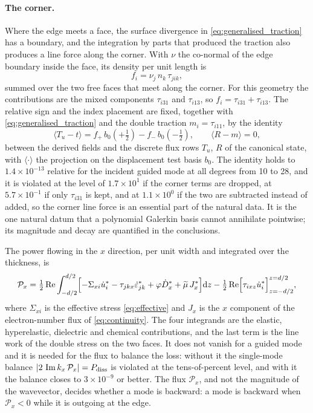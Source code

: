 \paragraph{The corner.}  Where the edge meets a face, the surface divergence in \eqref{eq:generalised_traction} has a boundary, and the integration by parts that produced the traction also produces a line force along the corner.  With $\nu$ the co-normal of the edge boundary inside the face, its density per unit length is
\begin{equation}
\label{eq:corner_force}
f_i=\nu_j\,n_k\,\tau_{jik},
\end{equation}
summed over the two free faces that meet along the corner.  For this geometry the contributions are the mixed components $\tau_{i31}$ and $\tau_{i13}$, so $f_i=\tau_{i31}+\tau_{i13}$.  The relative sign and the index placement are fixed, together with \eqref{eq:generalised_traction} and the double traction $m_i=\tau_{i11}$, by the identity
\begin{equation}
\label{eq:corner_identity}
\bigl\langle T_{\!u}-t\bigr\rangle
=f_+\,b_0(+\tfrac12)-f_-\,b_0(-\tfrac12),
\qquad
\bigl\langle R-m\bigr\rangle=0 ,
\end{equation}
between the derived fields and the discrete flux rows $T_{\!u}$, $R$ of the canonical state, with $\langle\cdot\rangle$ the projection on the displacement test basis $b_0$.  The identity holds to $1.4\times10^{-13}$ relative for the incident guided mode at all degrees from 10 to 28, and it is violated at the level of $1.7\times10^{1}$ if the corner terms are dropped, at $5.7\times10^{-1}$ if only $\tau_{i31}$ is kept, and at $1.1\times10^{0}$ if the two are subtracted instead of added, so the corner line force is an essential part of the natural data.  It is the one natural datum that a polynomial Galerkin basis cannot annihilate pointwise; its magnitude and decay are quantified in the conclusions.

The power flowing in the $x$ direction, per unit width and integrated over the thickness, is
\begin{equation}
\label{eq:Px_int}
\mathcal{P}_x=\tfrac12\operatorname{Re}\int_{-d/2}^{d/2}
\Bigl[-\Sigma_{xi}\dot u_i^{*}-\tau_{jkx}\dot\varepsilon_{jk}^{*}
+\varphi\dot D_x^{*}+\widetilde\mu\,J_x^{*}\Bigr]\mathrm{d} z
-\tfrac12\operatorname{Re}\Bigl[\tau_{ixz}\dot u_i^{*}\Bigr]_{z=-d/2}^{z=d/2} ,
\end{equation}
where $\Sigma_{xi}$ is the effective stress \eqref{eq:effective} and $J_x$ is the $x$ component of the electron-number flux of \eqref{eq:continuity}.  The four integrands are the elastic, hyperelastic, dielectric and chemical contributions, and the last term is the line work of the double stress on the two faces.  It does not vanish for a guided mode and it is needed for the flux to balance the loss: without it the single-mode balance $\lvert2\,\operatorname{Im} k_x\,\mathcal P_x\rvert=P_{\text{diss}}$ is violated at the tens-of-percent level, and with it the balance closes to $3\times10^{-9}$ or better.  The flux $\mathcal P_x$, and not the magnitude of the wavevector, decides whether a mode is backward: a mode is backward when $\mathcal{P}_x<0$ while it is outgoing at the edge.

